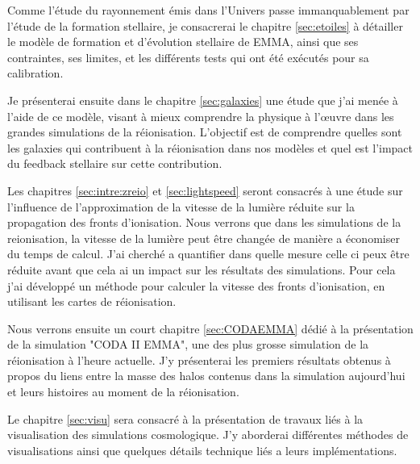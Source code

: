 Comme l'étude du rayonnement émis dans l'Univers passe immanquablement par l'étude de la formation stellaire, je consacrerai le chapitre \ref{sec:etoiles} à détailler le modèle de formation et d'évolution stellaire de EMMA, ainsi que ses contraintes, ses limites, et les différents tests qui ont été exécutés pour sa calibration.

Je présenterai ensuite dans le chapitre \ref{sec:galaxies} une étude que j'ai menée à l'aide de ce modèle, visant à mieux comprendre la physique à l'œuvre dans les grandes simulations de la réionisation.
L'objectif est de comprendre quelles sont les galaxies qui contribuent à la réionisation dans nos modèles et quel est l'impact du feedback stellaire sur cette contribution.

Les chapitres \ref{sec:intre:zreio} et \ref{sec:lightspeed} seront consacrés à une étude sur l'influence de l'approximation de la vitesse de la lumière réduite sur la propagation des fronts d'ionisation.
Nous verrons que dans les simulations de la reionisation, la vitesse de la lumière peut être changée de manière a économiser du temps de calcul.
J'ai cherché a quantifier dans quelle mesure celle ci peux être réduite avant que cela ai un impact sur les résultats des simulations.
Pour cela j'ai développé un méthode pour calculer la vitesse des fronts d'ionisation, en utilisant les cartes de réionisation.

Nous verrons ensuite un court chapitre \ref{sec:CODAEMMA} dédié à la présentation de la simulation "CODA II EMMA", une des plus grosse simulation de la réionisation à l'heure actuelle.
J'y présenterai les premiers résultats obtenus à propos du liens entre la masse des halos contenus dans la simulation aujourd'hui et leurs histoires au moment de la réionisation.

Le chapitre \ref{sec:visu} sera consacré à la présentation de travaux liés à la visualisation des simulations cosmologique.
J'y aborderai différentes méthodes de visualisations ainsi que quelques détails technique liés a leurs implémentations.



